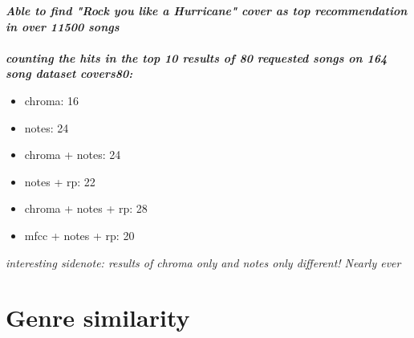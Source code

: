 \textit{\textbf{Able to find "Rock you like a Hurricane" cover as top recommendation in over 11500 songs\\}}
\ \\
\textit{\textbf{counting the hits in the top 10 results of 80 requested songs on 164 song dataset covers80:\\}}
\begin{itemize}
	\item chroma: 16
	\item notes: 24
	\item chroma + notes: 24
	\item notes + rp: 22
	\item chroma + notes + rp: 28
	\item mfcc + notes + rp: 20
\end{itemize}
\textit{interesting sidenote: results of chroma only and notes only different! Nearly ever}

\section{Genre similarity}

